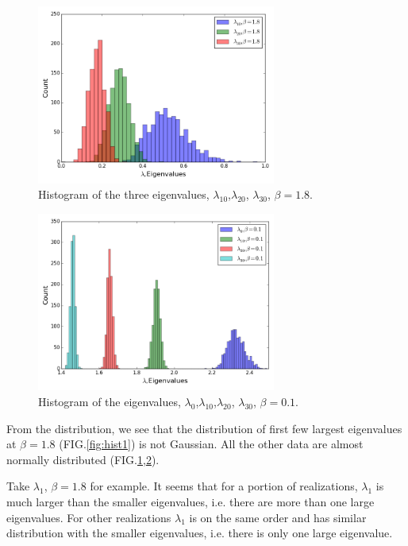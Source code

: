 \begin{figure}[ht]
\centering
  \includegraphics[width=0.7\textwidth]{img/matrix/eigHist2.png} 
\caption{Histogram of the three eigenvalues, $\lambda_{10}$,$\lambda_{20}$, 
$\lambda_{30}$, $\beta=1.8$.}
\label{fig:hist2}
\end{figure}

\begin{figure}[ht]
\centering
  \includegraphics[width=0.7\textwidth]{img/matrix/eigHist3.png} 
\caption{Histogram of the eigenvalues, $\lambda_0$,$\lambda_{10}$,$\lambda_{20}$, $\lambda_{30}$, $\beta=0.1$.}
\label{fig:hist3}
\end{figure}

From the distribution, we see that the distribution of first few largest 
eigenvalues at $\beta=1.8$ (FIG.\ref{fig:hist1}) is not Gaussian. 
All the other data are almost normally distributed (FIG.\ref{fig:hist2},\ref{fig:hist3}).

Take $\lambda_1$, $\beta=1.8$ for example. It seems that for a portion of realizations,
$\lambda_1$ is much larger than the smaller eigenvalues, i.e. there are more 
than one large eigenvalues.
For other
realizations $\lambda_1$ is on the same order and has similar distribution with 
the smaller eigenvalues, i.e. there is only one large eigenvalue. 


